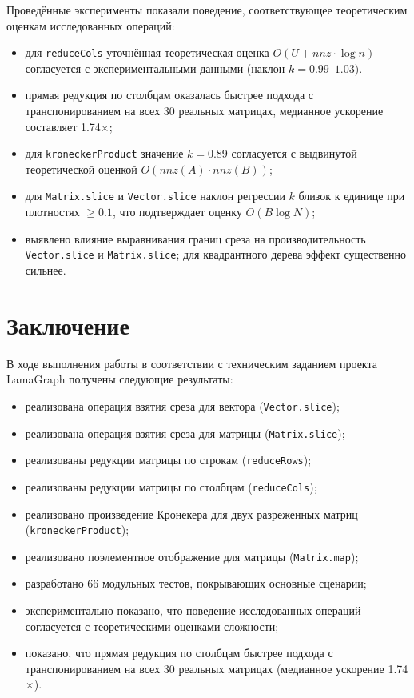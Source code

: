 \documentclass[a4paper]{article}
\begin{document}
Проведённые эксперименты показали поведение, соответствующее теоретическим оценкам исследованных операций:
\begin{itemize}
    \item для \texttt{reduceCols} уточнённая теоретическая оценка \(O(U + nnz \cdot \log n)\) согласуется с экспериментальными данными (наклон \(k = 0.99\)--\(1.03\)).
    \item прямая редукция по столбцам оказалась быстрее подхода с транспонированием на всех 30 реальных матрицах, медианное ускорение составляет 1.74$\times$;
    \item для \texttt{kroneckerProduct} значение \(k = 0.89\) согласуется с выдвинутой теоретической оценкой \(O(nnz(A) \cdot nnz(B))\);
    \item для \texttt{Matrix.slice} и \texttt{Vector.slice} наклон регрессии \(k\) близок к единице при плотностях \(\ge 0.1\), что подтверждает оценку \(O(B \log N)\);
    \item выявлено влияние выравнивания границ среза на производительность \texttt{Vector.slice} и \texttt{Matrix.slice}; для квадрантного дерева эффект существенно сильнее.
\end{itemize}

\section*{Заключение}

В ходе выполнения работы в соответствии с техническим заданием проекта LamaGraph получены следующие результаты:

\begin{itemize}
    \item реализована операция взятия среза для вектора (\texttt{Vector.slice});
    \item реализована операция взятия среза для матрицы (\texttt{Matrix.slice});
    \item реализованы редукции матрицы по строкам (\texttt{reduceRows});
    \item реализованы редукции матрицы по столбцам (\texttt{reduceCols});
    \item реализовано произведение Кронекера для двух разреженных матриц (\texttt{kroneckerProduct});
    \item реализовано поэлементное отображение для матрицы (\texttt{Matrix.map});
    \item разработано 66 модульных тестов, покрывающих основные сценарии;
    \item экспериментально показано, что поведение исследованных операций согласуется с теоретическими оценками сложности;
    \item показано, что прямая редукция по столбцам быстрее подхода с транспонированием на всех 30 реальных матрицах (медианное ускорение 1.74$\times$).
\end{itemize}
\end{document}
